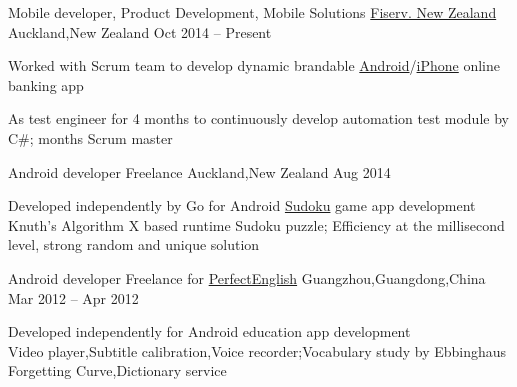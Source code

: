 
\begin{cventries}
	\cventry
	{Mobile developer, Product Development, Mobile Solutions}
	{\href{https://www.careers.fiserv.com/new-zealand}{Fiserv. New Zealand}}
	{Auckland,\enskip New Zealand}
	{Oct 2014 – Present}
	{
		\begin{cvitems}
			\item {Worked with Scrum team to develop dynamic brandable \href{https://play.google.com/store/apps/details?id=com.fiserv.touchbankingasp&hl=en}{Android}/\href{https://itunes.apple.com/us/app/touchbanking/id386678211?mt=8}{iPhone} online banking app}
			\item {As test engineer for 4 months to continuously develop automation test module by C\#; months Scrum master}
		\end{cvitems}
	}
\end{cventries}

\begin{cventries}
	\cventry
	{Android developer}
	{Freelance}
	{Auckland,\enskip New Zealand}
	{Aug 2014}
	{
		\begin{cvitems}
			\item {Developed independently by Go for Android \href{https://play.google.com/store/apps/details?id=com.gmail.jiangyang5157.sudoku}{Sudoku} game app development\\
			Knuth's Algorithm X based runtime Sudoku puzzle;\enskip
			Efficiency at the millisecond level, strong random and unique solution}
		\end{cvitems}
	}
\end{cventries}

\begin{cventries}
	\cventry
	{Android developer}
	{Freelance for \href{http://www.english119.cn}{PerfectEnglish}}
	{Guangzhou,\enskip Guangdong,\enskip China}
	{Mar 2012 – Apr 2012}
	{
		\begin{cvitems}
			\item {Developed independently for Android education app development\\
			Video player,\enskip Subtitle calibration,\enskip Voice recorder;\enskip Vocabulary study by Ebbinghaus Forgetting Curve,\enskip Dictionary service}
		\end{cvitems}
	}
\end{cventries}

